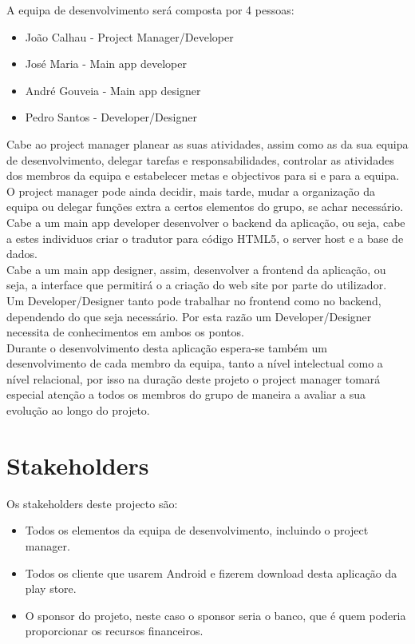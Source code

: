 \documentclass[a4paper]{article}
\begin{document}
A equipa de desenvolvimento será composta por 4 pessoas:
\begin{itemize}
\item João Calhau - Project Manager/Developer
\item José Maria - Main app developer
\item André Gouveia - Main app designer
\item Pedro Santos - Developer/Designer
\end{itemize}

\indent Cabe ao project manager planear as suas atividades, assim como as da sua equipa de desenvolvimento, delegar tarefas e responsabilidades, controlar as atividades dos membros da equipa e estabelecer metas e objectivos para si e para a equipa. O project manager pode ainda decidir, mais tarde, mudar a organização da equipa ou delegar funções extra a certos elementos do grupo, se achar necessário. \\
\indent Cabe a um main app developer desenvolver o backend da aplicação, ou seja, cabe a estes individuos criar o tradutor para código HTML5, o server host e a base de dados. \\
\indent Cabe a um main app designer, assim, desenvolver a frontend da aplicação, ou seja, a interface que permitirá o a criação do web site por parte do utilizador. \\
\indent Um Developer/Designer tanto pode trabalhar no frontend como no backend, dependendo do que seja necessário. Por esta razão um Developer/Designer necessita de conhecimentos em ambos os pontos. \\
\indent Durante o desenvolvimento desta aplicação espera-se também um desenvolvimento de cada membro da equipa, tanto a nível intelectual como a nível relacional, por isso na duração deste projeto o project manager tomará especial atenção a todos os membros do grupo de maneira a avaliar a sua evolução ao longo do projeto.

\newpage

\section{Stakeholders}

Os stakeholders deste projecto são:
\begin{itemize}
\item Todos os elementos da equipa de desenvolvimento, incluindo o project manager.
\item Todos os cliente que usarem Android e fizerem download desta aplicação da play store.
\item O sponsor do projeto, neste caso o sponsor seria o banco, que é quem poderia proporcionar os recursos financeiros.
\end{itemize}
\end{document}
